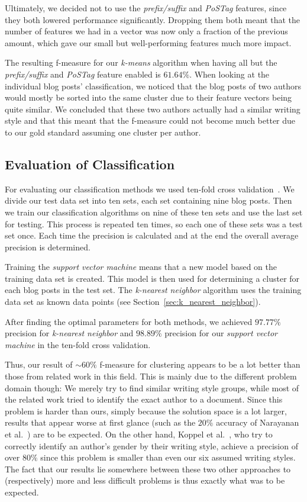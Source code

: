 Ultimately, we decided not to use the \textit{prefix/suffix} and \textit{PoSTag} features, since they both lowered performance significantly.
Dropping them both meant that the number of features we had in a vector was now only a fraction of the previous amount, which gave our small but well-performing features much more impact.


The resulting f-measure for our \textit{k-means} algorithm when having all but the \textit{prefix/suffix} and \textit{PoSTag} feature enabled is $61.64\%$.
When looking at the individual blog posts' classification, we noticed that the blog posts of two authors would mostly be sorted into the same cluster due to their feature vectors being quite similar.
We concluded that these two authors actually had a similar writing style and that this meant that the f-measure could not become much better due to our gold standard assuming one cluster per author.


\subsection{Evaluation of Classification}
\label{sec:evaluation_classification}

For evaluating our classification methods we used ten-fold cross validation~\cite{kohavi1995study}.
We divide our test data set into ten sets, each set containing nine blog posts.
Then we train our classification algorithms on nine of these ten sets and use the last set for testing.
This process is repeated ten times, so each one of these sets was a test set once.
Each time the precision is calculated and at the end the overall average precision is determined.


Training the \textit{support vector machine} means that a new model based on the training data set is created.
This model is then used for determining a cluster for each blog posts in the test set.
The \textit{k-nearest neighbor} algorithm uses the training data set as known data points (see Section~\ref{sec:k_nearest_neighbor}).


After finding the optimal parameters for both methods, we achieved $97.77\%$ precision for \textit{k-nearest neighbor} and $98.89\%$ precision for our \textit{support vector machine} in the ten-fold cross validation.


Thus, our result of $\sim60\%$ f-measure for clustering appears to be a lot better than those from related work in this field.
This is mainly due to the different problem domain though:
We merely try to find similar writing style groups, while most of the related work tried to identify the exact author to a document.
Since this problem is harder than ours, simply because the solution space is a lot larger, results that appear worse at first glance (such as the $20\%$ accuracy of Narayanan et al.~\cite{narayanan2012feasibility}) are to be expected.
On the other hand, Koppel et al.~\cite{koppel2003automatically}, who try to correctly identify an author's gender by their writing style, achieve a precision of over $80\%$ since this problem is smaller than even our six assumed writing styles.
The fact that our results lie somewhere between these two other approaches to (respectively) more and less difficult problems is thus exactly what was to be expected.